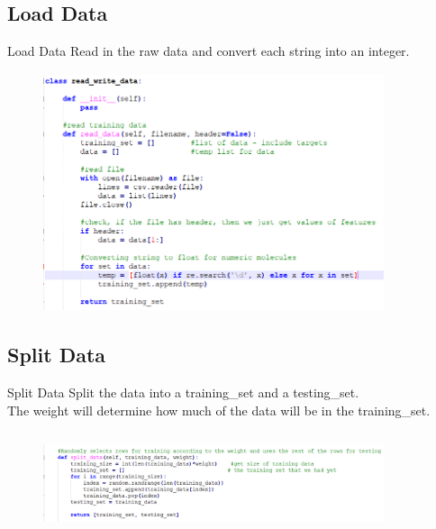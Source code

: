 \documentclass{beamer}
\begin{document}
\subsection{Load Data}
    \begin{frame}{Load Data}
        \hspace{0.5cm} Read in the raw data and convert each string into an integer.
        \begin{center}
            \begin{figure}
                \begin{center}
                     \includegraphics[width = 10cm, height = 7cm]{Theme/images/readData.PNG}
                \end{center}
            \end{figure}
        \end{center}
    \end{frame}

\subsection{Split Data}
    \begin{frame}{Split Data}
        \hspace{0.5cm} Split the data into a training\_set and a testing\_set. \\
        \hspace{0.5cm} The weight will determine how much of the data will be in the training\_set.
        \begin{center}
            \begin{figure}
                \begin{center}
                    \includegraphics[width = 10cm, height = 3cm]{Theme/images/split.PNG}
                \end{center}
            \end{figure}
        \end{center}
    \end{frame}
\end{document}
